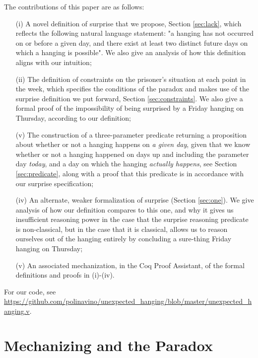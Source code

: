 \documentclass[runningheads]{llncs}
\begin{document}
  The contributions of this paper are as follows:

  \begin{itemize}
    \item[(i)] A novel definition of surprise that we propose,
    Section \ref{sec:lack}, which reflects
    the following natural language statement: "a hanging has not occurred on or before a given day,
    and there exist at least two distinct future days on which a hanging
    is possible". We
    also give an analysis of how this definition aligns with our intuition;

    \item[(ii)] The definition of constraints on the prisoner's situation at each
    point in the week, which specifies the conditions of the paradox and makes use
    of the surprise definition we put forward, Section \ref{sec:constraints}. We also
    give a formal proof of the impossibility of being surprised by a Friday hanging
    on Thursday, according to our definition;

    \item[(v)] The construction of a three-parameter predicate returning a proposition about
    whether or not a hanging happens on \emph{a given day}, given that we know whether or not a hanging
    happened on days up and including the parameter day \emph{today}, and a day on which the hanging
    \emph{actually happens}, see Section \ref{sec:predicate}, along with a proof that this predicate
    is in accordance with our surprise specification;

    \item[(iv)] An alternate, weaker formalization of surprise (Section \ref{sec:one}). We give analysis of how
    our definition compares to this one, and why it gives us insufficient reasoning
    power in the case that the surprise reasoning predicate is non-classical, but
    in the case that it is classical, allows us to reason ourselves out of the hanging entirely by concluding
    a sure-thing Friday hanging on Thursday;

    \item[(v)] An associated mechanization, in the Coq Proof Assistant, of the formal
    definitions and proofs in (i)-(iv).
  \end{itemize}

  For our code, see \url{https://github.com/polinavino/unexpected_hanging/blob/master/unexpected_hanging.v}.

\section{Mechanizing and the Paradox}
\label{sec:form}
\end{document}
